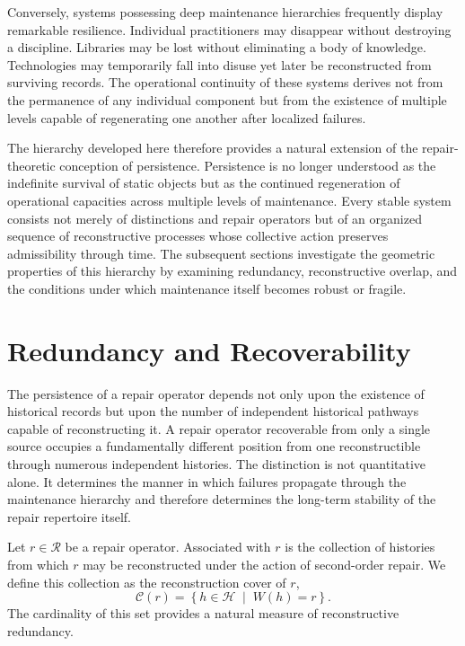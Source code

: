 \documentclass[12pt,oneside]{article}
\theoremstyle{plain}
\theoremstyle{definition}
\theoremstyle{remark}
\theoremstyle{plain}
\newcommand{\Hist}{\mathcal{H}}
\begin{document}
Conversely, systems possessing deep maintenance hierarchies frequently display remarkable
resilience. Individual practitioners may disappear without destroying a discipline. Libraries may
be lost without eliminating a body of knowledge. Technologies may temporarily fall into disuse yet
later be reconstructed from surviving records. The operational continuity of these systems derives
not from the permanence of any individual component but from the existence of multiple levels
capable of regenerating one another after localized failures.

The hierarchy developed here therefore provides a natural extension of the repair-theoretic
conception of persistence. Persistence is no longer understood as the indefinite survival of static
objects but as the continued regeneration of operational capacities across multiple levels of
maintenance. Every stable system consists not merely of distinctions and repair operators but of an
organized sequence of reconstructive processes whose collective action preserves admissibility
through time. The subsequent sections investigate the geometric properties of this hierarchy by
examining redundancy, reconstructive overlap, and the conditions under which maintenance itself
becomes robust or fragile.

\section{Redundancy and Recoverability}

The persistence of a repair operator depends not only upon the existence of historical records but
upon the number of independent historical pathways capable of reconstructing it. A repair operator
recoverable from only a single source occupies a fundamentally different position from one
reconstructible through numerous independent histories. The distinction is not quantitative alone.
It determines the manner in which failures propagate through the maintenance hierarchy and therefore
determines the long-term stability of the repair repertoire itself.

Let $r \in \mathcal{R}$ be a repair operator. Associated with $r$ is the collection of histories
from which $r$ may be reconstructed under the action of second-order repair. We define this
collection as the reconstruction cover of $r$,
\[
\mathcal{C}(r)
=
\left\{
h \in \Hist
\;\middle|\;
W(h) = r
\right\}.
\]
The cardinality of this set provides a natural measure of reconstructive redundancy.
\end{document}
